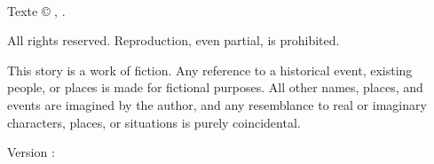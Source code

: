 \thispagestyle{empty}

{\small
\setlength{\parindent}{0em}\setlength{\parskip}{1em}

~

\vfill
\begin{Spacing}{1.2}
Texte \copyright{} \editionyear, \authorname.

All rights reserved. Reproduction, even partial, is prohibited.

This story is a work of fiction. Any reference to a historical event, existing people, or places is made for fictional purposes. All other names, places, and events are imagined by the author, and any resemblance to real or imaginary characters, places, or situations is purely coincidental.

Version : \version
\end{Spacing}
}
